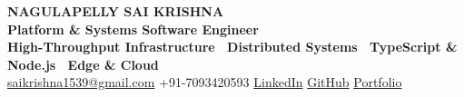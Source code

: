 \documentclass[10pt,letterpaper]{article}
\begin{document}
\begin{center}
    {\Huge \textbf{\color{primary} NAGULAPELLY SAI KRISHNA}} \\[2pt]
    {\large \textbf{Platform \& Systems Software Engineer}} \\[2pt]
    \textbf{High-Throughput Infrastructure \textbar\ Distributed Systems \textbar\ TypeScript \& Node.js \textbar\ Edge \& Cloud} \\[3pt]
    \href{mailto:saikrishna1539@gmail.com}{saikrishna1539@gmail.com} \quad \textbar \quad
    +91-7093420593 \quad \textbar \quad
    \href{https://linkedin.com/in/saikrishna}{LinkedIn} \quad \textbar \quad
    \href{https://github.com/nagulapellysaikrishna}{GitHub} \quad \textbar \quad
    \href{https://nagulapellysaikrishna.github.io}{Portfolio}
\end{center}

\vspace{-6pt}

\setlength{\columnsep}{0.03\textwidth}
\end{document}
